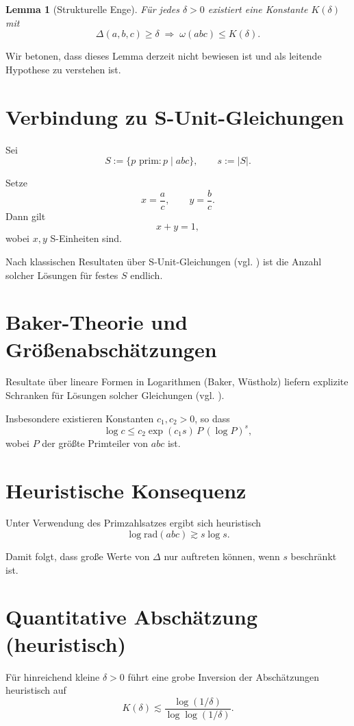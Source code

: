 \documentclass[11pt]{article}
\newtheorem{lemma}{Lemma}
\begin{document}
	\begin{lemma}[Strukturelle Enge]
		Für jedes $\delta>0$ existiert eine Konstante $K(\delta)$ mit
		\[
		\Delta(a,b,c) \ge \delta \;\Rightarrow\; \omega(abc) \le K(\delta).
		\]
	\end{lemma}
	
	Wir betonen, dass dieses Lemma derzeit nicht bewiesen ist und als
	leitende Hypothese zu verstehen ist.
	
	\section{Verbindung zu S-Unit-Gleichungen}
	
	Sei
	\[
	S := \{p \text{ prim} : p \mid abc\}, \qquad s := |S|.
	\]
	
	Setze
	\[
	x = \frac{a}{c}, \qquad y = \frac{b}{c}.
	\]
	Dann gilt
	\[
	x + y = 1,
	\]
	wobei $x,y$ S-Einheiten sind.
	
	Nach klassischen Resultaten über S-Unit-Gleichungen (vgl. \cite{EvertseGyory})
	ist die Anzahl solcher Lösungen für festes $S$ endlich.
	
	\section{Baker-Theorie und Größenabschätzungen}
	
	Resultate über lineare Formen in Logarithmen (Baker, Wüstholz) liefern
	explizite Schranken für Lösungen solcher Gleichungen (vgl. \cite{BakerWustholz}).
	
	Insbesondere existieren Konstanten $c_1,c_2>0$, so dass
	\[
	\log c \le c_2 \exp(c_1 s)\, P\, (\log P)^s,
	\]
	wobei $P$ der größte Primteiler von $abc$ ist.
	
	\section{Heuristische Konsequenz}
	
	Unter Verwendung des Primzahlsatzes ergibt sich heuristisch
	\[
	\log \mathrm{rad}(abc) \gtrsim s \log s.
	\]
	
	Damit folgt, dass große Werte von $\Delta$ nur auftreten können,
	wenn $s$ beschränkt ist.
	
	\section{Quantitative Abschätzung (heuristisch)}
	
	Für hinreichend kleine $\delta>0$ führt eine grobe Inversion der Abschätzungen heuristisch auf
	\[
	K(\delta) \lesssim \frac{\log(1/\delta)}{\log\log(1/\delta)}.
	\]
	
\end{document}
